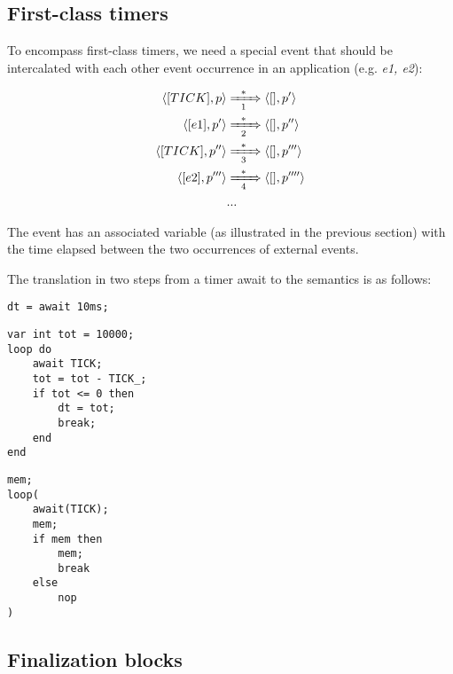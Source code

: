 \subsection{First-class timers}

To encompass first-class timers, we need a special  event that 
should be intercalated with each other event occurrence in an application (e.g.  
\emph{e1, e2}):

\begin{align*}
\langle [TICK], p \rangle
    & \xRightarrow[~~1~~]{*}
\langle [    ], p' \rangle
\\
\langle [e1], p' \rangle
    & \xRightarrow[~~2~~]{*}
\langle [  ], p'' \rangle
\\
\langle [TICK], p'' \rangle
    & \xRightarrow[~~3~~]{*}
\langle [    ], p''' \rangle
\\
\langle [e2], p''' \rangle
    & \xRightarrow[~~4~~]{*}
\langle [  ], p'''' \rangle
\\
& ...
\end{align*}

The  event has an associated variable  (as illustrated 
in the previous section) with the time elapsed between the two occurrences of 
external events.

The translation in two steps from a timer await to the semantics is as follows:

\noindent
\begin{minipage}[t]{0.30\linewidth}
\begin{lstlisting}
dt = await 10ms;
\end{lstlisting}
\end{minipage}
%
\begin{minipage}[t]{0.37\linewidth}
\begin{lstlisting}
var int tot = 10000;
loop do
    await TICK;
    tot = tot - TICK_;
    if tot <= 0 then
        dt = tot;
        break;
    end
end
\end{lstlisting}
\end{minipage}
%
\begin{minipage}[t]{0.30\linewidth}
\begin{lstlisting}
mem;
loop(
    await(TICK);
    mem;
    if mem then
        mem;
        break
    else
        nop
)
\end{lstlisting}
\end{minipage}

\subsection{Finalization blocks}
\label{sec.formal.fins}

